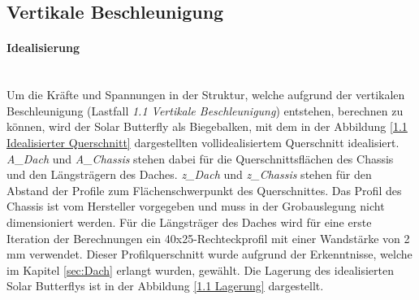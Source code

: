 \subsection{Vertikale Beschleunigung}
\label{1.1 Vertikale Beschleunigung}
  \paragraph{Idealisierung}\mbox{}\\
  Um die Kräfte und Spannungen in der Struktur, welche aufgrund der vertikalen Beschleunigung (Lastfall \emph{1.1 Vertikale Beschleunigung}) entstehen, berechnen zu können, wird der Solar Butterfly als Biegebalken, mit dem in der Abbildung \ref{1.1 Idealisierter Querschnitt} dargestellten vollidealisiertem Querschnitt idealisiert. \emph{A\_Dach} und \emph{A\_Chassis} stehen dabei für die Querschnittsflächen des Chassis und den Längsträgern des Daches. \emph{z\_Dach} und \emph{z\_Chassis} stehen für den Abstand der Profile zum Flächenschwerpunkt des Querschnittes. Das Profil des Chassis ist vom Hersteller vorgegeben und muss in der Grobauslegung nicht dimensioniert werden. Für die Längsträger des Daches wird für eine erste Iteration der Berechnungen ein 40x25-Rechteckprofil mit einer Wandstärke von 2 mm verwendet. Dieser Profilquerschnitt wurde aufgrund der Erkenntnisse, welche im Kapitel \ref{sec:Dach} erlangt wurden, gewählt. Die Lagerung des idealisierten Solar Butterflys ist in der Abbildung \ref{1.1 Lagerung} dargestellt.

